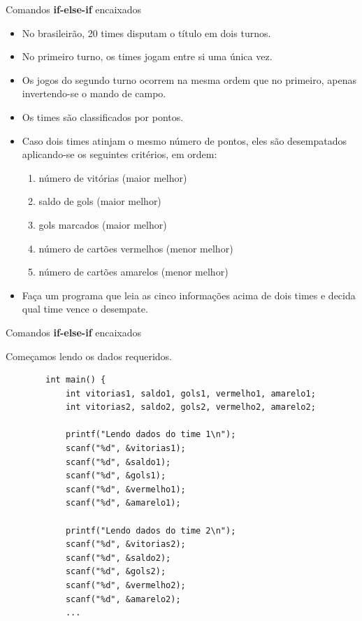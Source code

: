 \documentclass[handout]{beamer}
\begin{document}
\begin{frame}[fragile]{Comandos {\bf if-else-if} encaixados}

    \begin{itemize}[<+->]
        \item No brasileirão, 20 times disputam o título em dois turnos.
        \item No primeiro turno, os times jogam entre si uma única vez.
        \item Os jogos do segundo turno ocorrem na mesma ordem que no primeiro, apenas invertendo-se o mando de campo.
        \item Os times são classificados por pontos.
        \item Caso dois times atinjam o mesmo número de pontos, eles são desempatados aplicando-se os seguintes critérios, em ordem:
        \begin{enumerate}
            \item número de vitórias (maior melhor)
            \item saldo de gols (maior melhor)
            \item gols marcados (maior melhor)
            \item número de cartões vermelhos (menor melhor)
            \item número de cartões amarelos (menor melhor)
        \end{enumerate}
        \item Faça um programa que leia as cinco informações acima de dois times e decida qual time vence o desempate.
    \end{itemize}
\end{frame}

\begin{frame}[fragile]{Comandos {\bf if-else-if} encaixados}

    Começamos lendo os dados requeridos.
    \begin{verbatim}
        int main() {
            int vitorias1, saldo1, gols1, vermelho1, amarelo1;
            int vitorias2, saldo2, gols2, vermelho2, amarelo2;

            printf("Lendo dados do time 1\n");
            scanf("%d", &vitorias1);
            scanf("%d", &saldo1);
            scanf("%d", &gols1);
            scanf("%d", &vermelho1);
            scanf("%d", &amarelo1);

            printf("Lendo dados do time 2\n");
            scanf("%d", &vitorias2);
            scanf("%d", &saldo2);
            scanf("%d", &gols2);
            scanf("%d", &vermelho2);
            scanf("%d", &amarelo2);
            ...
    \end{verbatim}
\end{frame}
\end{document}

